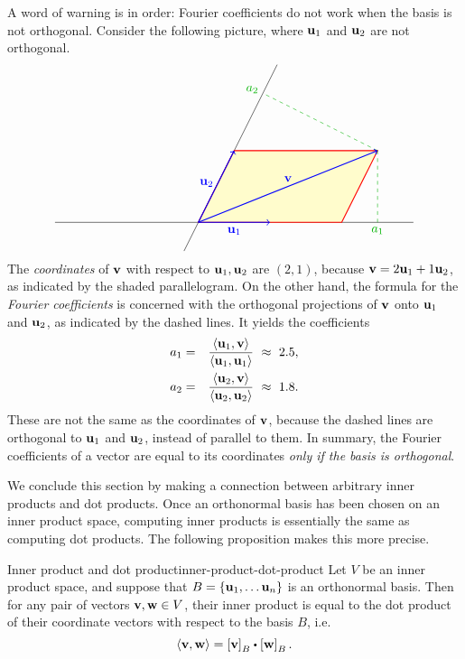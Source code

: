 A word of warning is in order: Fourier coefficients do not work when
the basis is not orthogonal. Consider the following picture, where
$\vect{u}_1$ and $\vect{u}_2$ are not orthogonal.
\begin{equation*}
  \begin{tikzpicture}[scale=2]
    \draw (-2,0) -- (3,0);
    \draw (-0.2,-0.4) -- (1.1,2.2);
    \draw[thick,red,fill=yellow!20] (0,0) -- (2,0) -- (2.5,1) -- (0.5,1) -- cycle;
    \draw[dashed,green!70!black] (2.5,1) -- (2.5,0) node[below]{$a_1$};
    \draw[dashed,green!70!black] (2.5,1) -- (0.9,1.8) node[left,yshift=3]{$a_2$};
    \draw[thick,blue,->] (0,0) -- node[below]{$\vect{u}_1$} (1,0);
    \draw[thick,blue,->] (0,0) -- node[left, pos=0.55]{$\vect{u}_2$} (0.5,1);
    \draw[thick,blue,->] (0,0) -- node[above]{$\vect{v}$} (2.5,1);
  \end{tikzpicture}
\end{equation*}
The {\em coordinates} of $\vect{v}$ with respect to
$\vect{u}_1,\vect{u}_2$ are $(2,1)$, because
$\vect{v}=2\vect{u}_1+1\vect{u}_2$, as indicated by the shaded
parallelogram. On the other hand, the formula for the {\em Fourier
  coefficients} is concerned with the orthogonal projections of
$\vect{v}$ onto $\vect{u}_1$ and $\vect{u}_2$, as indicated by the
dashed lines. It yields the coefficients
\begin{eqnarray*}
  a_1 &=& \frac{\iprod{\vect{u}_1,\vect{v}}}{\iprod{\vect{u}_1,\vect{u}_1}} ~\approx~ 2.5, \\
  a_2 &=& \frac{\iprod{\vect{u}_2,\vect{v}}}{\iprod{\vect{u}_2,\vect{u}_2}} ~\approx~ 1.8. \\
\end{eqnarray*}
These are not the same as the coordinates of $\vect{v}$, because the
dashed lines are orthogonal to $\vect{u}_1$ and $\vect{u}_2$, instead
of parallel to them. In summary, the Fourier coefficients of a vector
are equal to its coordinates {\em only if the basis is orthogonal}.

We conclude this section by making a connection between arbitrary
inner products and dot products.  Once an orthonormal basis has been
chosen on an inner product space, computing inner products is
essentially the same as computing dot products. The following
proposition makes this more precise.

\begin{proposition}{Inner product and dot product}{inner-product-dot-product}
  Let $V$ be an inner product space, and suppose that
  $B=\set{\vect{u}_1,\ldots\vect{u}_n}$ is an orthonormal basis. Then
  for any pair of vectors $\vect{v},\vect{w}\in V$, their inner
  product is equal to the dot product of their coordinate vectors with
  respect to the basis $B$, i.e.
  \begin{equation*}
    \iprod{\vect{v},\vect{w}}
    = \coord{\vect{v}}_B \dotprod \coord{\vect{w}}_B.
  \end{equation*}
\end{proposition}

